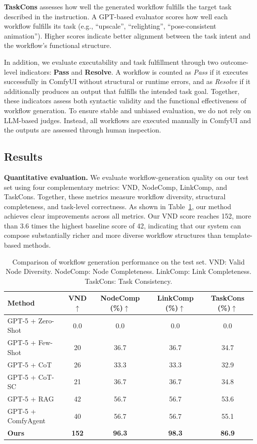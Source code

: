 \documentclass[runningheads]{llncs}
\begin{document}
\noindent \textbf{TaskCons} assesses how well the generated workflow fulfills the target task described in the instruction. A GPT-based evaluator scores how well each workflow fulfills its task (e.g., ``upscale'', ``relighting'', ``pose-consistent animation''). Higher scores indicate better alignment between the task intent and the workflow’s functional structure.

In addition, we evaluate executability and task fulfillment through two outcome-level indicators: \textbf{Pass} and \textbf{Resolve}.
A workflow is counted as \textit{Pass} if it executes successfully in ComfyUI without structural or runtime errors, and as \textit{Resolve} if it additionally produces an output that fulfills the intended task goal. Together, these indicators assess both syntactic validity and the functional effectiveness of workflow generation.  To ensure stable and unbiased evaluation, we do not rely on LLM-based judges. Instead, all workflows are executed manually in ComfyUI and the outputs are assessed through human inspection.




\subsection{Results}
\textbf{Quantitative evaluation.} 
We evaluate workflow-generation quality on our test set using four complementary metrics: VND, NodeComp, LinkComp, and TaskCons. Together, these metrics measure workflow diversity, structural completeness, and task-level correctness. As shown in Table~\ref{tab:structure}, our method achieves clear improvements across all metrics. Our VND score reaches 152, more than 3.6 times the highest baseline score of 42, indicating that our system can compose substantially richer and more diverse workflow structures than template-based methods.
\begin{table}[!ht]
\centering
\caption{Comparison of workflow generation performance on the test set.
VND: Valid Node Diversity.
NodeComp: Node Completeness.
LinkComp: Link Completeness.
TaskCons: Task Consistency.}
\label{tab:structure}
\begin{tabular}{lcccc}
\toprule
Method & VND$\uparrow$ & NodeComp (\%)$\uparrow$ & LinkComp (\%)$\uparrow$ & TaskCons (\%)$\uparrow$ \\
\midrule
GPT-5 + Zero-Shot  & 0.0  & 0.0  & 0.0  & 0.0  \\
GPT-5 + Few-Shot   & 20   & 36.7 & 36.7 & 34.7 \\
GPT-5 + CoT        & 26   & 33.3 & 33.3 & 32.9 \\
GPT-5 + CoT-SC     & 21   & 36.7 & 36.7 & 34.8 \\
GPT-5 + RAG        & 42   & 56.7 & 56.7 & 53.6 \\
GPT-5 + ComfyAgent & 40   & 56.7 & 56.7 & 55.1 \\
\midrule
\textbf{Ours} & \textbf{152} & \textbf{96.3} & \textbf{98.3} & \textbf{86.9} \\
\bottomrule
\end{tabular}
\end{table}
\end{document}
